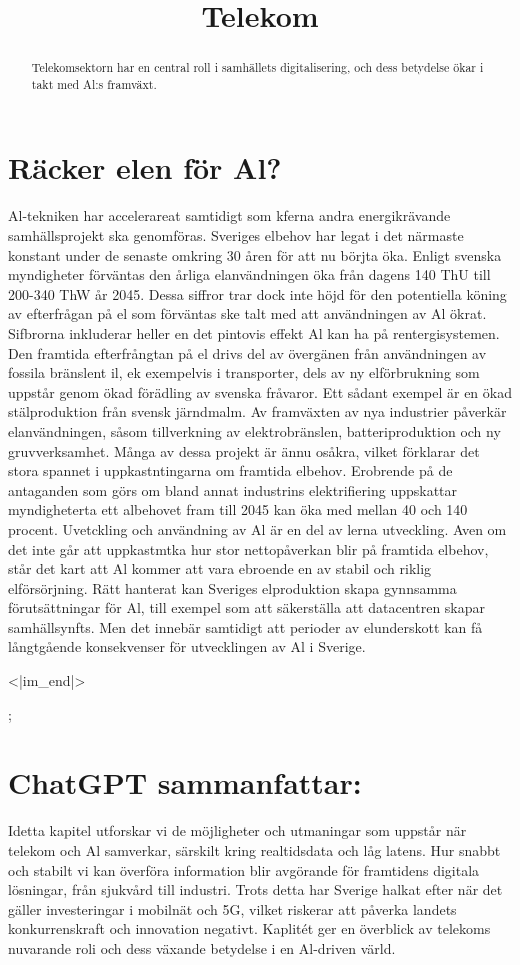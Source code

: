 {{{\section*{Räcker elen för Al?}
Al-tekniken har accelerareat samtidigt som kferna andra energikrävande samhällsprojekt ska genomföras. Sveriges elbehov har legat i det närmaste konstant under de senaste omkring 30 åren för att nu börjta öka. Enligt svenska myndigheter förväntas den årliga elanvändningen öka från dagens 140 ThU till 200-340 ThW år 2045. Dessa siffror trar dock inte höjd för den potentiella köning av efterfrågan på el som förväntas ske talt med att användningen av Al ökrat. \({ }^{}\) Sifbrorna inkluderar heller en det pintovis effekt Al kan ha på rentergisystemen.
Den framtida efterfrångtan på el drivs del av övergänen från användningen av fossila bränslent il, ek exempelvis i transporter, dels av ny elförbrukning som uppstår genom ökad förädling av svenska fråvaror. Ett sådant exempel är en ökad stälproduktion från svensk järndmalm. Av framväxten av nya industrier påverkär
elanvändningen, såsom tillverkning av elektrobränslen, batteriproduktion och ny gruvverksamhet. Många av dessa projekt är ännu osåkra, vilket förklarar det stora spannet i uppkastntingarna om framtida elbehov. Erobrende på de antaganden som görs om bland annat industrins elektrifiering uppskattar myndigheterta ett albehovet fram till 2045 kan öka med mellan 40 och 140 procent.
Uvetckling och användning av Al är en del av lerna utveckling. Aven om det inte går att uppkastmtka hur stor nettopåverkan blir på framtida elbehov, står det kart att Al kommer att vara ebroende en av stabil och riklig elförsörjning. Rätt hanterat kan Sveriges elproduktion skapa gynnsamma förutsättningar för Al, till exempel som att säkerställa att datacentren skapar samhällsynfts. Men det innebär samtidigt att perioder av elunderskott kan få långtgående konsekvenser för utvecklingen av Al i Sverige.

<|im_end|>};

\title{
Telekom
}
\section*{ChatGPT sammanfattar:}
\begin{abstract}
Telekomsektorn har en central roll i samhällets digitalisering, och dess betydelse ökar i takt med Al:s framväxt.
\end{abstract}
Idetta kapitel utforskar vi de möjligheter och utmaningar som uppstår när telekom och Al samverkar, särskilt kring realtidsdata och låg latens. Hur snabbt och stabilt vi kan överföra information blir avgörande för framtidens digitala lösningar, från sjukvård till industri. Trots detta har Sverige halkat efter när det gäller investeringar i mobilnät och 5G, vilket riskerar att påverka landets konkurrenskraft och innovation negativt. Kaplitét ger en överblick av telekoms nuvarande roli och dess växande betydelse i en Al-driven värld.
}}
